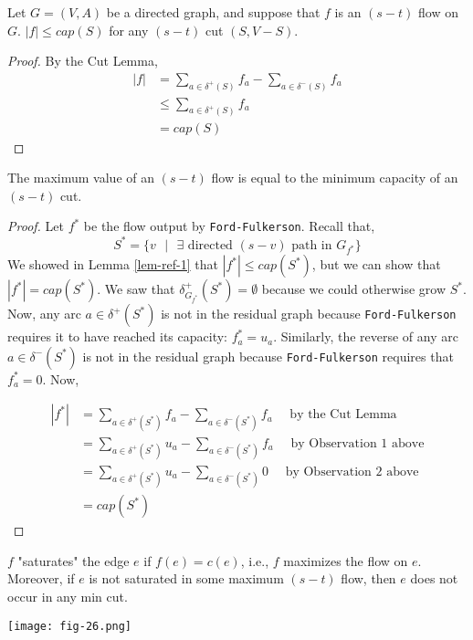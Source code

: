	\begin{lem}
		Let $G = (V,A)$ be a directed graph, and suppose that $f$ is an $(s-t)$ flow on $G$. $|f| \leq cap(S)$ for any $(s-t)$ cut $(S, V - S)$.
	\label{lem-ref-1}
	\end{lem}

	\begin{proof}
		By the Cut Lemma,
		\begin{align*}
			|f| &= \sum_{a \in \delta^+(S)} f_a - \sum_{a \in \delta^-(S)} f_a \\
			    &\leq \sum_{a \in \delta^+(S)} f_a \\
			    &= cap(S)
		\end{align*}
	\end{proof}

	\begin{thm}{}
		The maximum value of an $(s-t)$ flow is equal to the minimum capacity of an $(s-t)$ cut.
	\end{thm}

	\begin{proof}
		Let $f^*$ be the flow output by \texttt{Ford-Fulkerson}. Recall that,
		\[S^* = \{v \text{ $|$ } \exists \text{ directed $(s-v)$ path in $G_{f^*}$}\}\]
		\noindent We showed in Lemma \ref{lem-ref-1} that $|f^*| \leq cap(S^*)$, but we can show that $|f^*| = cap(S^*)$. We saw that $\delta^+_{G_{f^*}}(S^*) = \emptyset$ because we could otherwise grow $S^*$. Now, any arc $a \in \delta^+(S^*)$ is not in the residual graph because \texttt{Ford-Fulkerson} requires it to have reached its capacity: $f^*_a = u_a$. Similarly, the reverse of any arc $a \in \delta^-(S^*)$ is not in the residual graph because \texttt{Ford-Fulkerson} requires that $f^*_a = 0$. Now,
		
		\begin{align*}
			|f^*| &= \sum_{a \in \delta^+(S^*)} f_a - \sum_{a \in \delta^-(S^*)} f_a \quad \text{ by the Cut Lemma} \\
			      &= \sum_{a \in \delta^+(S^*)} u_a - \sum_{a \in \delta^-(S^*)} f_a \quad \text{ by Observation 1 above} \\
			      &= \sum_{a \in \delta^+(S^*)} u_a - \sum_{a \in \delta^-(S^*)} 0 \quad \text{ by Observation 2 above} \\
			      &= cap(S^*)
		\end{align*}
	\end{proof}

	\begin{marginfigure}
		$f$ "saturates" the edge $e$ if $f(e) = c(e)$, i.e., $f$ maximizes the flow on $e$. Moreover, if $e$ is not saturated in some maximum $(s-t)$ flow, then $e$ does not occur in any min cut.
		\begin{center}
			\texttt{[image: fig-26.png]}
		\end{center}
	\end{marginfigure}

